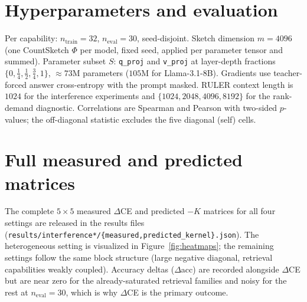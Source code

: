 \documentclass{article} %
\begin{document}
\section{Hyperparameters and evaluation}
\label{app:hparams}

Per capability: $n_{\text{train}}=32$, $n_{\text{eval}}=30$, seed-disjoint. Sketch dimension
$m=4096$ (one CountSketch $\Phi$ per model, fixed seed, applied per parameter tensor and summed).
Parameter subset $S$: \texttt{q\_proj} and \texttt{v\_proj} at layer-depth fractions
$\{0,\tfrac14,\tfrac12,\tfrac34,1\}$, $\approx 73$M parameters ($105$M for Llama-3.1-8B).
Gradients use teacher-forced
answer cross-entropy with the prompt masked. RULER context length is $1024$ for the interference
experiments and $\{1024,2048,4096,8192\}$ for the rank-demand diagnostic. Correlations are
Spearman and Pearson with two-sided $p$-values; the off-diagonal statistic excludes the five
diagonal (self) cells.

\section{Full measured and predicted matrices}
\label{app:tables}

The complete $5\times5$ measured $\Delta$CE and predicted $-K$ matrices for all four settings are
released in the results files (\texttt{results/interference*/\{measured,predicted\_kernel\}.json}).
The heterogeneous setting is visualized in Figure~\ref{fig:heatmaps}; the remaining settings
follow the same block structure (large negative diagonal, retrieval capabilities weakly coupled).
Accuracy deltas ($\Delta$acc) are recorded alongside $\Delta$CE but are near zero for the
already-saturated retrieval families and noisy for the rest at $n_{\text{eval}}=30$, which is why
$\Delta$CE is the primary outcome.
\end{document}

